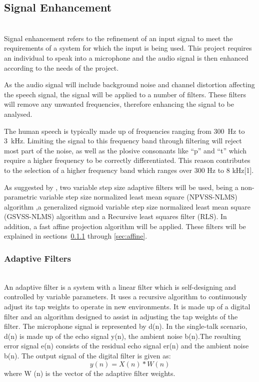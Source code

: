 \documentclass[10pt,twocolumn]{witseiepaper}
\begin{document}
\subsection{Signal Enhancement}  \hfill\\
Signal enhancement refers to the refinement of an input signal to meet the requirements of a system for which the input is being used. This project requires an individual to speak into a microphone and the audio signal is then enhanced according to the needs of the project. 

As the audio signal will include background noise and channel distortion affecting the speech signal, the signal will be applied to a number of filters. These filters will remove any unwanted frequencies, therefore enhancing the signal to be analysed.

The human speech is typically made up of frequencies ranging from 300~Hz to 3~kHz. Limiting the signal to this frequency band through filtering will reject most part of the noise, as well as the plosive consonants like “p” and “t” which require a higher frequency to be correctly differentiated. This reason contributes to the selection of a higher frequency band which ranges over 300 Hz to 8 kHz[1]. 

As suggested by \cite{echo}, two variable step size adaptive filters will be used, being a non-parametric variable step size normalized least mean square (NPVSS-NLMS) algorithm ,a generalized sigmoid variable step size normalized least mean square (GSVSS-NLMS) algorithm and a Recursive least squares filter (RLS). In addition, a fast affine projection algorithm will be applied. These filters will be explained in sections~\ref{sec:af} through \ref{sec:affine}.

\subsubsection{Adaptive Filters}\label{sec:af} \hfill\\
An adaptive filter is a system with a linear filter which is self-designing and controlled by variable parameters. It uses a recursive algorithm to continuously adjust its tap weights to operate in new environments. It is made up of a digital filter and an algorithm designed to assist in adjusting the tap weights of the filter.  The microphone signal is represented by d(n). In the single-talk scenario, d(n) is made up of the echo signal y(n), the ambient noise b(n).The resulting error signal e(n) consists of the residual echo signal er(n) and the ambient noise b(n). The output signal of the digital filter is given as:
\begin{equation}\label{my_first_eqn}
y(n)=X(n)*W(n)
\end{equation}
where W (n) is the vector of the adaptive filter weights.
\end{document}
